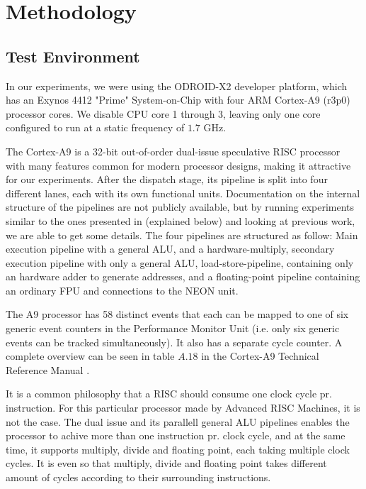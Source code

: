 \section{Methodology}


\subsection{Test Environment}
In our experiments, we were using the ODROID-X2 \cite{odroid-x2} developer
platform, which has an Exynos 4412 "Prime" System-on-Chip with four ARM
Cortex-A9 (r3p0) processor cores. We disable CPU core 1 through 3, leaving only
one core configured to run at a static frequency of $1.7$ GHz.

The Cortex-A9 is a 32-bit out-of-order dual-issue speculative RISC processor
with many features common for modern processor designs, making it attractive for
our experiments. After the dispatch stage, its pipeline is split into four
different lanes, each with its own functional units. Documentation on the
internal structure of the pipelines are not publicly available, but by running
experiments similar to the ones presented in \cite{paper} (explained below) and
looking at previous work\cite{armtech}\cite{7cpu}\cite{lotofdocs}, we are able
to get some details. The four pipelines are structured as follow: Main execution
pipeline with a general ALU, and a hardware-multiply, secondary execution
pipeline with only a general ALU, load-store-pipeline, containing only an
hardware adder to generate addresses, and a floating-point pipeline containing
an ordinary FPU and connections to the NEON unit.

The A9 processor has 58 distinct events that each can be mapped to one of six
generic event counters in the Performance Monitor Unit (i.e. only six generic
events can be tracked simultaneously). It also has a separate cycle counter. A
complete overview can be seen in table $A.18$ in the Cortex-A9 Technical
Reference Manual \cite{armtech}.


It is a common philosophy that a RISC should consume one clock cycle pr.
instruction\cite{unknown}. For this particular processor made by Advanced RISC
Machines, it is not the case. The dual issue and its parallell general ALU
pipelines enables the processor to achive more than one instruction pr. clock
cycle, and at the same time, it supports multiply, divide and floating point,
each taking multiple clock cycles. It is even so that multiply, divide and
floating point takes different amount of cycles according to their surrounding
instructions.

